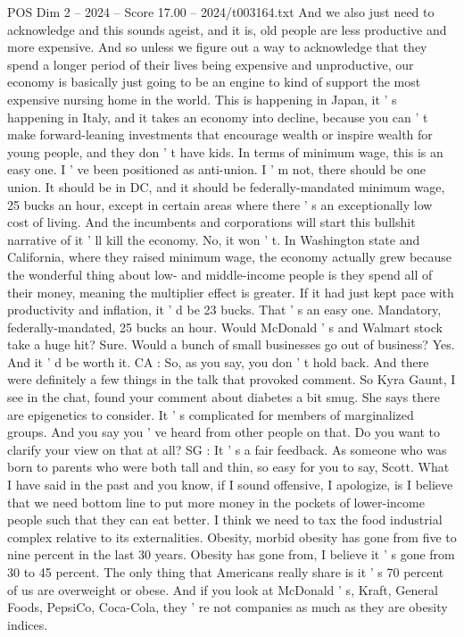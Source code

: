 \begin{textsample}{POS Dim 2 – 2024 – Score 17.00 – 2024/t003164.txt}
And we also just need to acknowledge and this sounds ageist, and it is, old people are less productive and more expensive.
And so unless we figure out a way to acknowledge that they spend a longer period of their lives being expensive and unproductive, our economy is basically just going to be an engine to kind of support the most expensive nursing home in the world.
This is happening in Japan, it ' s happening in Italy, and it takes an economy into decline, because you can ' t make forward-leaning investments that encourage wealth or inspire wealth for young people, and they don ' t have kids.
In terms of minimum wage, this is an easy one.
I ' ve been positioned as anti-union.
I ' m not, there should be one union.
It should be in DC, and it should be federally-mandated minimum wage, 25 bucks an hour, except in certain areas where there ' s an exceptionally low cost of living.
And the incumbents and corporations will start this bullshit narrative of it ' ll kill the economy.
No, it won ' t.
In Washington state and California, where they raised minimum wage, the economy actually grew because the wonderful thing about low- and middle-income people is they spend all of their money, meaning the multiplier effect is greater.
If it had just kept pace with productivity and inflation, it ' d be 23 bucks.
That ' s an easy one.
Mandatory, federally-mandated, 25 bucks an hour.
Would McDonald ' s and Walmart stock take a huge hit?
Sure.
Would a bunch of small businesses go out of business?
Yes.
And it ' d be worth it.
CA : So, as you say, you don ' t hold back.
And there were definitely a few things in the talk that provoked comment.
So Kyra Gaunt, I see in the chat, found your comment about diabetes a bit smug.
She says there are epigenetics to consider.
It ' s complicated for members of marginalized groups.
And you say you ' ve heard from other people on that.
Do you want to clarify your view on that at all?
SG : It ' s a fair feedback.
As someone who was born to parents who were both tall and thin, so easy for you to say, Scott.
What I have said in the past and you know, if I sound offensive, I apologize, is I believe that we need bottom line to put more money in the pockets of lower-income people such that they can eat better.
I think we need to tax the food industrial complex relative to its externalities.
Obesity, morbid obesity has gone from five to nine percent in the last 30 years.
Obesity has gone from, I believe it ' s gone from 30 to 45 percent.
The only thing that Americans really share is it ' s 70 percent of us are overweight or obese.
And if you look at McDonald ' s, Kraft, General Foods, PepsiCo, Coca-Cola, they ' re not companies as much as they are obesity indices.

\end{textsample}
